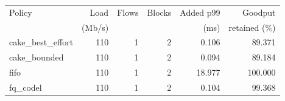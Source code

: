{\small
\begin{tabular}{@{}lrrrrr@{}}
\hline
Policy & Load & Flows & Blocks & Added p99 & Goodput \\
 & (Mb/s) & & & (ms) & retained (\%) \\
\hline
cake\_best\_effort & 110 & 1 & 2 & 0.106 & 89.371 \\
cake\_bounded & 110 & 1 & 2 & 0.094 & 89.184 \\
fifo & 110 & 1 & 2 & 18.977 & 100.000 \\
fq\_codel & 110 & 1 & 2 & 0.104 & 99.368 \\
\hline
\end{tabular}
}
